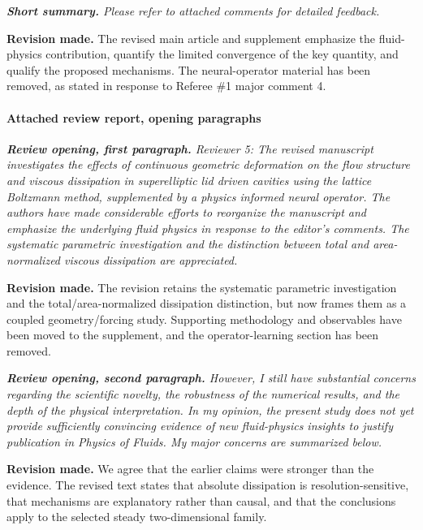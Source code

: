 \documentclass[11pt,a4paper]{article}
\newcommand{\qcomment}[1]{\textcolor{deepblue}{\itshape #1}}
\newcommand{\revwork}[1]{\textbf{\textcolor{revgreen}{#1}}}
\begin{document}
\medskip
\noindent\qcomment{\textbf{Short summary.} Please refer to attached comments for detailed feedback.}

\noindent\revwork{Revision made.} The revised main article and supplement emphasize the fluid-physics contribution, quantify the limited convergence of the key quantity, and qualify the proposed mechanisms. The neural-operator material has been removed, as stated in response to Referee \#1 major comment 4.

\medskip
\paragraph{Attached review report, opening paragraphs}

\medskip
\noindent\qcomment{\textbf{Review opening, first paragraph.} Reviewer 5: The revised manuscript investigates the effects of continuous geometric deformation on the flow structure and viscous dissipation in superelliptic lid driven cavities using the lattice Boltzmann method, supplemented by a physics informed neural operator. The authors have made considerable efforts to reorganize the manuscript and emphasize the underlying fluid physics in response to the editor's comments. The systematic parametric investigation and the distinction between total and area-normalized viscous dissipation are appreciated.}

\noindent\revwork{Revision made.} The revision retains the systematic parametric investigation and the total/area-normalized dissipation distinction, but now frames them as a coupled geometry/forcing study. Supporting methodology and observables have been moved to the supplement, and the operator-learning section has been removed.

\medskip
\noindent\qcomment{\textbf{Review opening, second paragraph.} However, I still have substantial concerns regarding the scientific novelty, the robustness of the numerical results, and the depth of the physical interpretation. In my opinion, the present study does not yet provide sufficiently convincing evidence of new fluid-physics insights to justify publication in Physics of Fluids. My major concerns are summarized below.}

\noindent\revwork{Revision made.} We agree that the earlier claims were stronger than the evidence. The revised text states that absolute dissipation is resolution-sensitive, that mechanisms are explanatory rather than causal, and that the conclusions apply to the selected steady two-dimensional family.
\end{document}
